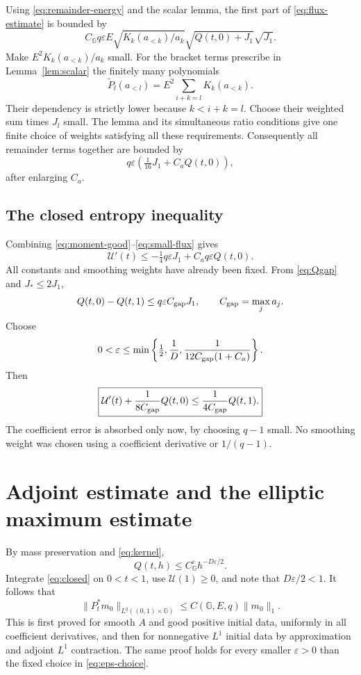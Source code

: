 \documentclass[11pt,a4paper]{amsart}
\numberwithin{equation}{section}
\theoremstyle{remark}\newtheorem{remark}[theorem]{Remark}
\newcommand{\G}{\mathbb G}
\newcommand{\eps}{\varepsilon}
\newcommand{\cU}{\mathcal U}
\newcommand{\norm}[1]{\lVert #1\rVert}
\begin{document}
Using \eqref{eq:remainder-energy} and the scalar lemma, the first part of
\eqref{eq:flux-estimate} is bounded by
\[
 C_\G q\eps E\sqrt{K_k(a_{<k})/a_k}
             \sqrt{Q(t,0)+J_1}\sqrt{J_1}.
\]
Make $E^2K_k(a_{<k})/a_k$ small. For the bracket terms prescribe in
Lemma~\ref{lem:scalar} the finitely many polynomials
\[
 \widetilde P_l(a_{<l})=E^2\sum_{i+k=l}K_k(a_{<k}).
\]
Their dependency is strictly lower because $k<i+k=l$. Choose their weighted
sum times $J_l$ small. The lemma and its simultaneous ratio conditions give
one finite choice of weights satisfying all these requirements. Consequently
all remainder terms together are bounded by
\begin{equation}\label{eq:small-flux}
 q\eps\left(\tfrac1{16}J_1+C_aQ(t,0)\right),
\end{equation}
after enlarging $C_a$.

\subsection{The closed entropy inequality}
Combining \eqref{eq:moment-good}--\eqref{eq:small-flux} gives
\begin{equation}\label{eq:time-J1}
 \cU'(t)\le-\tfrac14q\eps J_1+C_aq\eps Q(t,0).
\end{equation}
All constants and smoothing weights have already been fixed. From
\eqref{eq:Qgap} and $J_*\le2J_1$,
\[
 Q(t,0)-Q(t,1)\le q\eps C_{\rm gap}J_1,
 \qquad C_{\rm gap}=\max_ja_j.
\]
Choose
\begin{equation}\label{eq:eps-choice}
 0<\eps\le\min\left\{\tfrac12,\frac1D,
               \frac1{12C_{\rm gap}(1+C_a)}\right\}.
\end{equation}
Then
\begin{equation}\label{eq:closed}
 \boxed{\displaystyle
 \cU'(t)+\frac1{8C_{\rm gap}}Q(t,0)
       \le\frac1{4C_{\rm gap}}Q(t,1).}
\end{equation}
The coefficient error is absorbed only now, by choosing $q-1$ small. No
smoothing weight was chosen using a coefficient derivative or $1/(q-1)$.

\section{Adjoint estimate and the elliptic maximum estimate}\label{sec:analytic}
By mass preservation and \eqref{eq:kernel},
\[
 Q(t,h)\le C_\G^\eps h^{-D\eps/2}.
\]
Integrate \eqref{eq:closed} on $0<t<1$, use $\cU(1)\ge0$, and note that
$D\eps/2<1$. It follows that
\begin{equation}\label{eq:adjoint}
 \norm{P_t^*m_0}_{L^q((0,1)\times\G)}
 \le C(\G,E,q)\norm{m_0}_1.
\end{equation}
This is first proved for smooth $A$ and good positive initial data, uniformly
in all coefficient derivatives, and then for nonnegative $L^1$ initial data by
approximation and adjoint $L^1$ contraction. The same proof holds for every
smaller $\eps>0$ than the fixed choice in \eqref{eq:eps-choice}.
\end{document}
